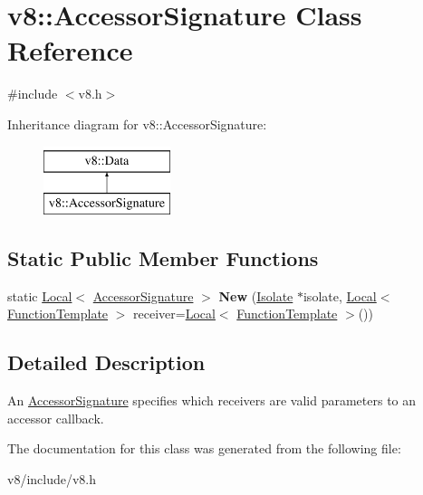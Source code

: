 \hypertarget{classv8_1_1AccessorSignature}{}\section{v8\+:\+:Accessor\+Signature Class Reference}
\label{classv8_1_1AccessorSignature}


{\ttfamily \#include $<$v8.\+h$>$}

Inheritance diagram for v8\+:\+:Accessor\+Signature\+:\begin{figure}[H]
\begin{center}
\leavevmode
\includegraphics[height=2.000000cm]{classv8_1_1AccessorSignature}
\end{center}
\end{figure}
\subsection*{Static Public Member Functions}
\begin{DoxyCompactItemize}
\item 
static \hyperlink{classv8_1_1Local}{Local}$<$ \hyperlink{classv8_1_1AccessorSignature}{Accessor\+Signature} $>$ {\bfseries New} (\hyperlink{classv8_1_1Isolate}{Isolate} $\ast$isolate, \hyperlink{classv8_1_1Local}{Local}$<$ \hyperlink{classv8_1_1FunctionTemplate}{Function\+Template} $>$ receiver=\hyperlink{classv8_1_1Local}{Local}$<$ \hyperlink{classv8_1_1FunctionTemplate}{Function\+Template} $>$())\hypertarget{classv8_1_1AccessorSignature_a2d7f28b404be5ecdb501aaf572a7ee52}{}\label{classv8_1_1AccessorSignature_a2d7f28b404be5ecdb501aaf572a7ee52}

\end{DoxyCompactItemize}


\subsection{Detailed Description}
An \hyperlink{classv8_1_1AccessorSignature}{Accessor\+Signature} specifies which receivers are valid parameters to an accessor callback. 

The documentation for this class was generated from the following file\+:\begin{DoxyCompactItemize}
\item 
v8/include/v8.\+h\end{DoxyCompactItemize}
